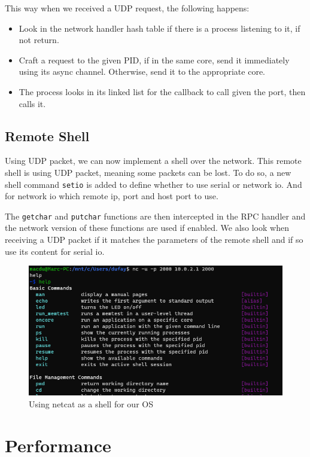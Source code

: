This way when we received a UDP request, the following happens:
\begin{itemize}
\item Look in the network handler hash table if there is a process listening to it, if not return.
\item Craft a request to the given PID, if in the same core, send it immediately using its async channel. Otherwise, send it to the appropriate core.
\item The process looks in its linked list for the callback to call given the port, then calls it.
\end{itemize}


\subsection{Remote Shell}

Using UDP packet, we can now implement a shell over the network. This remote shell is using UDP packet, meaning some packets can be lost. To do so, a new shell command \verb|setio| is added to define whether to use serial or network io. And for network io which remote ip, port and host port to use.

\medskip

The \verb|getchar| and \verb|putchar| functions are then intercepted in the RPC handler and the network version of these functions are used if enabled. We also look when receiving a UDP packet if it matches the parameters of the remote shell and if so use its content for serial io.

\begin{figure}[H]
    \centering
    \includegraphics[scale=0.75]{images/network/network_io.png}
    \caption{Using netcat as a shell for our OS}
\end{figure}

\section{Performance}

